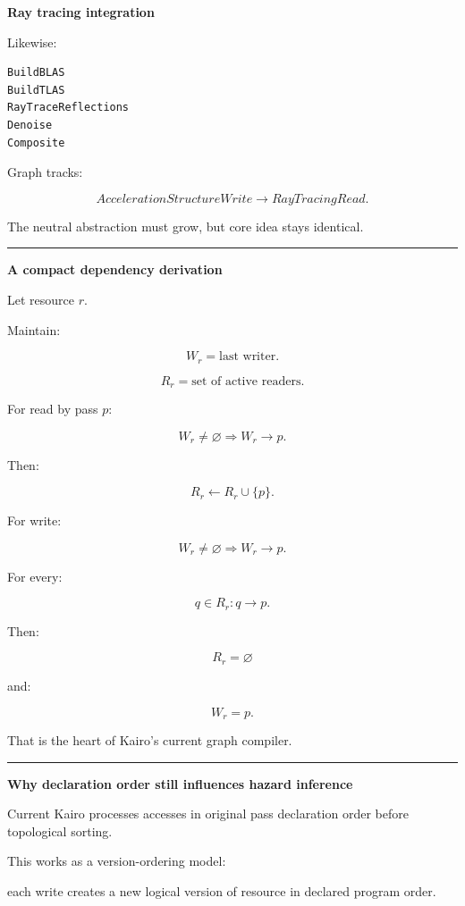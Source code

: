 \textbf{Ray tracing integration}

Likewise:

\begin{verbatim}
BuildBLAS
BuildTLAS
RayTraceReflections
Denoise
Composite
\end{verbatim}

Graph tracks:

\[
AccelerationStructureWrite
\rightarrow
RayTracingRead.
\]

The neutral abstraction must grow, but core idea stays identical.

\begin{center}\rule{0.5\linewidth}{0.5pt}\end{center}

\textbf{A compact dependency derivation}

Let resource \(r\).

Maintain:

\[
W_r
=
\text{last writer}.
\]

\[
R_r
=
\text{set of active readers}.
\]

For read by pass \(p\):

\[
W_r\neq\varnothing
\Rightarrow
W_r\rightarrow p.
\]

Then:

\[
R_r\leftarrow
R_r\cup\{p\}.
\]

For write:

\[
W_r\neq\varnothing
\Rightarrow
W_r\rightarrow p.
\]

For every:

\[
q\in R_r:
q\rightarrow p.
\]

Then:

\[
R_r=\varnothing
\]

and:

\[
W_r=p.
\]

That is the heart of Kairo's current graph compiler.

\begin{center}\rule{0.5\linewidth}{0.5pt}\end{center}

\textbf{Why declaration order still influences hazard inference}

Current Kairo processes accesses in original pass declaration order before topological sorting.

This works as a version-ordering model:

each write creates a new logical version of resource in declared program order.


